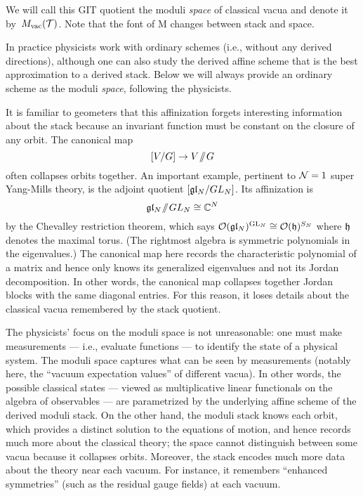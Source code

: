 \documentclass[11pt]{amsart}
\begin{document}
We will call this GIT quotient the moduli {\em space} of classical vacua and denote it by~$M_{\rm vac}(\mathcal T)$.
Note that the font of M changes between stack and space.

\begin{rmk}
In practice physicists work with ordinary schemes (i.e., without any derived directions), 
although one can also study the derived affine scheme that is the best approximation to a derived stack.
Below we will always provide an ordinary scheme as the moduli {\em space},
following the physicists.
\end{rmk}

It is familiar to geometers that this affinization forgets interesting information about the stack because an invariant function must be constant on the closure of any orbit.
The canonical map
\[
[V/G] \to V\!\sslash\! G
\]
often collapses orbits together.
An important example, pertinent to $\mathcal N =1$ super Yang-Mills theory, is the adjoint quotient $[\mathfrak{g} \mathfrak{l}_N/ GL_N]$.
Its affinization is
\[
\mathfrak{g} \mathfrak{l}_N \!\sslash\! GL_N \cong \mathbb C^N
\]
by the Chevalley restriction theorem, 
which says $\mathcal O(\mathfrak{g} \mathfrak{l}_N)^{{\rm GL}_N} \cong \mathcal O(\frak{h})^{S_N}$ where $\frak{h}$ denotes the maximal torus.
(The rightmost algebra is symmetric polynomials in the eigenvalues.)
The canonical map here records the characteristic polynomial of a matrix and hence only knows its generalized eigenvalues and not its Jordan decomposition.
In other words, the canonical map collapses together Jordan blocks with the same diagonal entries.
For this reason, it loses details about the classical vacua remembered by the stack quotient.

\begin{rmk}\label{sols vs states}
The physicists' focus on the moduli space is not unreasonable:
one must make measurements --- i.e., evaluate functions --- to identify the state of a physical system.
The moduli space captures what can be seen by measurements (notably here, the ``vacuum expectation values'' of different vacua).
In other words, the possible classical states --- viewed as multiplicative linear functionals on the algebra of observables --- are parametrized by the underlying affine scheme of the derived moduli stack.
On the other hand, the moduli stack knows each orbit, which provides a distinct solution to the equations of motion,
and hence records much more about the classical theory; 
the space cannot distinguish between some vacua because it collapses orbits.
Moreover, the stack encodes much more data about the theory near each vacuum.
For instance, it remembers ``enhanced symmetries'' (such as the residual gauge fields) at each vacuum.
\end{rmk}
\end{document}
